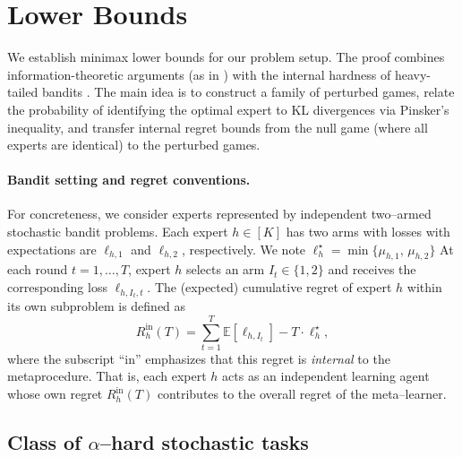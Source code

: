 \documentclass[a4paper,14pt]{extarticle}
\theoremstyle{plain}
\begin{document}

% 





\clearpage

\appendix
\tableofcontents

\section{Lower Bounds}
\label{sec:lower-bounds}

We establish minimax lower bounds for our problem setup.
The proof combines information-theoretic arguments (as in \cite{seldin2014prediction})
with the internal hardness of heavy-tailed bandits \cite{bubeck2013bandits}.
The main idea is to construct a family of perturbed games,
relate the probability of identifying the optimal expert to KL divergences via Pinsker’s inequality,
and transfer internal regret bounds from the null game (where all experts are identical)
to the perturbed games.

\paragraph{Bandit setting and regret conventions.}
For concreteness, we consider experts represented by independent two–armed stochastic bandit problems.
Each expert $h \in [K]$ has two arms with losses with expectations are $\ell_{h,1}$ and $\ell_{h,2}$, respectively. We note $\ell^\star_h = \min\{\mu_{h,1},\,\mu_{h,2}\}$
At each round $t = 1,\dots, T$, expert $h$ selects an arm $I_t \in \{1,2\}$ and receives the corresponding loss $\ell_{h,I_t,t}$.
The (expected) cumulative regret of expert $h$ within its own subproblem is defined as
\begin{equation}
\label{eq:internal-regret-def}
R_{h}^{\mathrm{in}}(T) =\sum_{t=1}^T \mathbb{E} [\ell_{h,I_t}] - T \cdot \ell_h^\star,
\end{equation}
where the subscript “in” emphasizes that this regret is \emph{internal} to the metaprocedure.
That is, each expert $h$ acts as an independent learning agent whose own regret $R_{h}^{\mathrm{in}}(T)$ contributes to the overall regret of the meta–learner.

\subsection{Class of $\alpha$–hard stochastic tasks}
\end{document}
